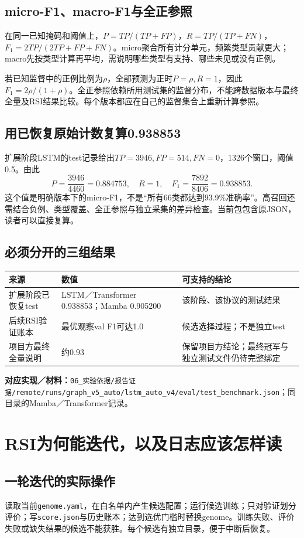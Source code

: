 \documentclass[11pt,a4paper,UTF8,fontset=fandol]{ctexart}
\newcommand{\code}[1]{{\small\nolinkurl{#1}}}
\newcommand{\where}[1]{\par{\small\color{green}\textbf{对应实现／材料：}#1}\par}
\begin{document}
\subsection{micro-F1、macro-F1与全正参照}
在同一已知掩码和阈值上，$P=TP/(TP+FP)$，$R=TP/(TP+FN)$，$F_1=2TP/(2TP+FP+FN)$。micro聚合所有计分单元，频繁类型贡献更大；macro先按类型计算再平均，需说明哪些类型有支持、哪些未见或没有正例。

若已知监督中的正例比例为$\rho$，全部预测为正时$P=\rho,R=1$，因此$F_1=2\rho/(1+\rho)$。全正参照依赖所用测试集的监督分布，不能跨数据版本与最终全量及RSI结果比较。每个版本都应在自己的监督集合上重新计算参照。

\subsection{用已恢复原始计数复算0.938853}
扩展阶段LSTM的test记录给出$TP=3946,FP=514,FN=0$，1326个窗口，阈值0.5。由此
\[
P=\frac{3946}{4460}=0.884753,\quad R=1,\quad
F_1=\frac{7892}{8406}=0.938853.
\]
这个值是明确版本下的micro-F1，不是“所有66类都达到93.9\%准确率”。高召回还需结合负例、类型覆盖、全正参照与独立采集的差异检查。当前包包含原JSON，读者可以直接复算。

\subsection{必须分开的三组结果}
\begin{tabularx}{\linewidth}{p{3.1cm}p{2.5cm}X}
\toprule 来源 & 数值 & 可支持的结论\\\midrule
扩展阶段已恢复test & LSTM／Transformer 0.938853；Mamba 0.905200 & 该阶段、该协议的测试结果\\
后续RSI验证账本 & 最优观察val F1可达1.0 & 候选选择过程；不是独立test\\
项目方最终全量说明 & 约0.93 & 保留项目方结论；最终冠军与独立测试文件仍待完整绑定\\
\bottomrule
\end{tabularx}
\where{\code{06_实验依据/报告证据/remote/runs/graph_v5_auto/lstm_auto_v4/eval/test_benchmark.json}；同目录的Mamba／Transformer记录。}

\section{RSI为何能迭代，以及日志应该怎样读}
\subsection{一轮迭代的实际操作}
读取当前\code{genome.yaml}，在白名单内产生候选配置；运行候选训练；只对验证划分评价；写\code{score.json}与历史账本；达到选优门槛时替换genome。训练失败、评价失败或缺失结果的候选不能获胜。每个候选有独立目录，便于中断后恢复。
\end{document}
